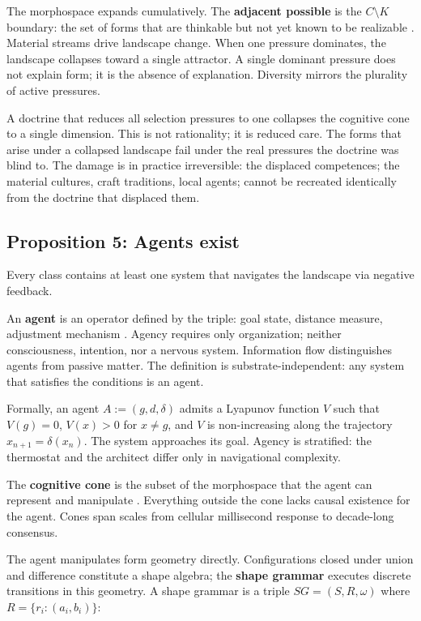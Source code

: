 The morphospace expands cumulatively. The \textbf{adjacent possible} is the $C \setminus K$ boundary: the set of forms that are thinkable but not yet known to be realizable \parencite{Kauffman1993}. Material streams drive landscape change. When one pressure dominates, the landscape collapses toward a single attractor. A single dominant pressure does not explain form; it is the absence of explanation. Diversity mirrors the plurality of active pressures.

A doctrine that reduces all selection pressures to one collapses the cognitive cone to a single dimension. This is not rationality; it is reduced care. The forms that arise under a collapsed landscape fail under the real pressures the doctrine was blind to. The damage is in practice irreversible: the displaced competences; the material cultures, craft traditions, local agents; cannot be recreated identically from the doctrine that displaced them.

\subsection{Proposition 5: Agents exist}
\label{sec:prop5}

Every class contains at least one system that navigates the landscape via negative feedback.

An \textbf{agent} is an operator defined by the triple: goal state, distance measure, adjustment mechanism \parencite{Rosenblueth1943, Wiener1948, Ashby1956}. Agency requires only organization; neither consciousness, intention, nor a nervous system. Information flow distinguishes agents from passive matter. The definition is substrate-independent: any system that satisfies the conditions is an agent.

Formally, an agent $A := (g, d, \delta)$ admits a Lyapunov function $V$ such that $V(g) = 0$, $V(x) > 0$ for $x \neq g$, and $V$ is non-increasing along the trajectory $x_{n+1} = \delta(x_n)$. The system approaches its goal. Agency is stratified: the thermostat and the architect differ only in navigational complexity.

The \textbf{cognitive cone} is the subset of the morphospace that the agent can represent and manipulate \parencite{Fields2022}. Everything outside the cone lacks causal existence for the agent. Cones span scales from cellular millisecond response to decade-long consensus.

The agent manipulates form geometry directly. Configurations closed under union and difference constitute a shape algebra; the \textbf{shape grammar} \parencite{Stiny1972} executes discrete transitions in this geometry. A shape grammar is a triple $SG = (S, R, \omega)$ where $R = \{r_i : (a_i, b_i)\}$:

